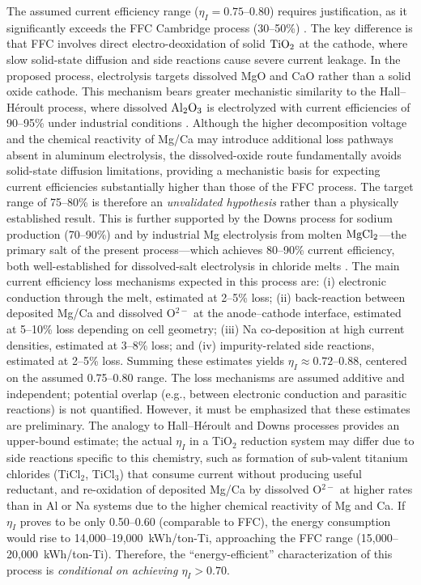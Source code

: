 \documentclass[sn-mathphys,Numbered]{sn-jnl}
\begin{document}
The assumed current efficiency range ($\eta_I = 0.75$--0.80) requires justification, as it significantly exceeds the FFC Cambridge process (30--50\%) \cite{fray2000}. The key difference is that FFC involves direct electro-deoxidation of solid $\ce{TiO2}$ at the cathode, where slow solid-state diffusion and side reactions cause severe current leakage. In the proposed process, electrolysis targets dissolved MgO and CaO rather than a solid oxide cathode. This mechanism bears greater mechanistic similarity to the Hall--H\'eroult process, where dissolved $\ce{Al2O3}$ is electrolyzed with current efficiencies of 90--95\% under industrial conditions \cite{kvande2014}. Although the higher decomposition voltage and the chemical reactivity of Mg/Ca may introduce additional loss pathways absent in aluminum electrolysis, the dissolved-oxide route fundamentally avoids solid-state diffusion limitations, providing a mechanistic basis for expecting current efficiencies substantially higher than those of the FFC process. The target range of 75--80\% is therefore an \emph{unvalidated hypothesis} rather than a physically established result. This is further supported by the Downs process for sodium production (70--90\%) and by industrial Mg electrolysis from molten $\ce{MgCl2}$---the primary salt of the present process---which achieves 80--90\% current efficiency, both well-established for dissolved-salt electrolysis in chloride melts \cite{plettcher1990,ji2026}. The main current efficiency loss mechanisms expected in this process are: (i) electronic conduction through the melt, estimated at 2--5\% loss; (ii) back-reaction between deposited Mg/Ca and dissolved O$^{2-}$ at the anode--cathode interface, estimated at 5--10\% loss depending on cell geometry; (iii) Na co-deposition at high current densities, estimated at 3--8\% loss; and (iv) impurity-related side reactions, estimated at 2--5\% loss. Summing these estimates yields $\eta_I \approx 0.72$--0.88, centered on the assumed 0.75--0.80 range. The loss mechanisms are assumed additive and independent; potential overlap (e.g., between electronic conduction and parasitic reactions) is not quantified. However, it must be emphasized that these estimates are preliminary. The analogy to Hall--H\'eroult and Downs processes provides an upper-bound estimate; the actual $\eta_I$ in a TiO$_2$ reduction system may differ due to side reactions specific to this chemistry, such as formation of sub-valent titanium chlorides (TiCl$_2$, TiCl$_3$) that consume current without producing useful reductant, and re-oxidation of deposited Mg/Ca by dissolved O$^{2-}$ at higher rates than in Al or Na systems due to the higher chemical reactivity of Mg and Ca. If $\eta_I$ proves to be only 0.50--0.60 (comparable to FFC), the energy consumption would rise to 14{,}000--19{,}000~kWh/ton-Ti, approaching the FFC range (15{,}000--20{,}000~kWh/ton-Ti). Therefore, the ``energy-efficient'' characterization of this process is \emph{conditional on achieving $\eta_I > 0.70$}.
\end{document}
